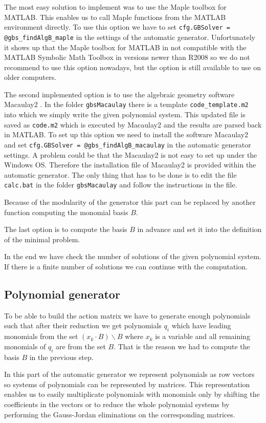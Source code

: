 The most easy solution to implement was to use the Maple toolbox for MATLAB. This enables us to call Maple functions from the MATLAB environment directly. To use this option we have to set \texttt{cfg.GBSolver = @gbs\_findAlgB\_maple} in the settings of the automatic generator. Unfortunately it shows up that the Maple toolbox for MATLAB in not compatible with the MATLAB Symbolic Math Toolbox in versions newer than R2008 so we do not recommend to use this option nowadays, but the option is still available to use on older computers.

The second implemented option is to use the algebraic geometry software Macaulay2 \cite{M2}. In the folder \texttt{gbsMacaulay} there is a template \texttt{code\_template.m2} into which we simply write the given polynomial system. This updated file is saved as \texttt{code.m2} which is executed by Macaulay2 and the results are parsed back in MATLAB. To set up this option we need to install the software Macaulay2 and set \texttt{cfg.GBSolver = @gbs\_findAlgB\_macaulay} in the automatic generator settings. A problem could be that the Macaulay2 is not easy to set up under the Windows OS. Therefore the installation file of Macaulay2 is provided within the automatic generator. The only thing that has to be done is to edit the file \texttt{calc.bat} in the folder \texttt{gbsMacaulay} and follow the instructions in the file.

Because of the modularity of the generator this part can be replaced by another function computing the monomial basis $B$.

The last option is to compute the basis $B$ in advance and set it into the definition of the minimal problem.

In the end we have check the number of solutions of the given polynomial system. If there is a finite number of solutions we can continue with the computation.

\subsection{Polynomial generator}
To be able to build the action matrix we have to generate enough polynomials such that after their reduction we get polynomials $q_i$ which have leading monomials from the set $\left(x_k \cdot B\right)\backslash B$ where $x_k$ is a variable and all remaining monomials of $q_i$ are from the set $B$. That is the reason we had to compute the basis $B$ in the previous step.

In this part of the automatic generator we represent polynomials as row vectors so systems of polynomials can be represented by matrices. This representation enables us to easily multiplicate polynomials with monomials only by shifting the coefficients in the vectors or to reduce the whole polynomial systems by performing the Gauss-Jordan eliminations on the corresponding matrices.

